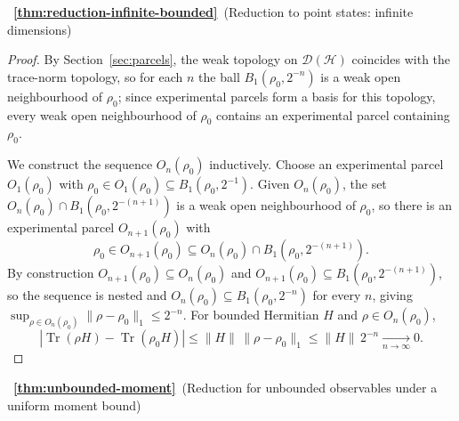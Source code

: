 \documentclass[11pt, onecolumn]{article}
\begin{document}
~{\bf \ref{thm:reduction-infinite-bounded}}~(Reduction to point states: infinite dimensions)

\begin{proof}
By Section~\ref{sec:parcels}, the weak topology on $\mathcal D(\mathcal H)$ coincides with the trace-norm topology, so for each $n$ the ball $B_1(\rho_0,2^{-n})$ is a weak open neighbourhood of $\rho_0$; since experimental parcels form a basis for this topology, every weak open neighbourhood of $\rho_0$ contains an experimental parcel containing $\rho_0$.

We construct the sequence $O_n(\rho_0)$ inductively. Choose an experimental parcel $O_1(\rho_0)$ with $\rho_0\in O_1(\rho_0)\subseteq B_1(\rho_0,2^{-1})$. Given $O_n(\rho_0)$, the set $O_n(\rho_0)\cap B_1(\rho_0,2^{-(n+1)})$ is a weak open neighbourhood of $\rho_0$, so there is an experimental parcel $O_{n+1}(\rho_0)$ with
\[
\rho_0\in O_{n+1}(\rho_0)\subseteq O_n(\rho_0)\cap B_1(\rho_0,2^{-(n+1)}).
\]
By construction $O_{n+1}(\rho_0)\subseteq O_n(\rho_0)$ and $O_{n+1}(\rho_0)\subseteq B_1(\rho_0,2^{-(n+1)})$, so the sequence is nested and $O_n(\rho_0)\subseteq B_1(\rho_0,2^{-n})$ for every $n$, giving $\sup_{\rho\in O_n(\rho_0)}\|\rho-\rho_0\|_1\le2^{-n}$. For bounded Hermitian $H$ and $\rho\in O_n(\rho_0)$,
\[
|\operatorname{Tr}(\rho H)-\operatorname{Tr}(\rho_0H)| \le \|H\|\,\|\rho-\rho_0\|_1 \le \|H\|\,2^{-n}
\xrightarrow[n\to\infty]{}0.
\]
\end{proof}

~{\bf \ref{thm:unbounded-moment}}~(Reduction for unbounded observables under a uniform moment bound)
\end{document}
